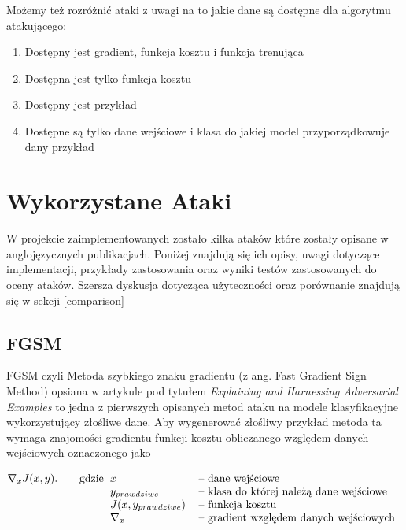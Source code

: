 \documentclass[
    left=2.5cm,         %
    right=2.5cm,        %
    top=2.5cm,          %
    bottom=3cm,         %
    bindingoffset=6mm,  %
    nohyphenation=false %
]{eiti/eiti-thesis}
\begin{document}
Możemy też rozróżnić ataki z uwagi na to jakie dane są dostępne dla algorytmu atakującego:
\begin{enumerate}
    \item Dostępny jest gradient, funkcja kosztu i funkcja trenująca
    \item Dostępna jest tylko funkcja kosztu
    \item Dostępny jest przykład
    \item Dostępne są tylko dane wejściowe i klasa do jakiej model przyporządkowuje dany przykład

\end{enumerate}

\newpage
\section{Wykorzystane Ataki}
W projekcie zaimplementowanych zostało kilka ataków które zostały opisane w anglojęzycznych publikacjach.
Poniżej znajdują się ich opisy, uwagi dotyczące implementacji, przykłady zastosowania oraz wyniki testów
zastosowanych do oceny ataków. Szersza dyskusja dotycząca użyteczności oraz porównanie znajdują się w sekcji \ref{comparison}

\subsection{FGSM}
    FGSM czyli Metoda szybkiego znaku gradientu (z ang. Fast Gradient Sign Method) opsiana w artykule
    pod tytułem \textit{Explaining and Harnessing Adversarial Examples}\cite{harnessing} to jedna z pierwszych
    opisanych metod ataku na modele klasyfikacyjne wykorzystujący złośliwe dane.
    Aby wygenerować złośliwy przykład metoda ta wymaga znajomości gradientu funkcji kosztu obliczanego względem danych
    wejściowych oznaczonego jako

    \begin{equation}
        \nabla_{x} J(x, y).
        \qquad\text{gdzie}
        \begin{tabular}[t]{ll}
        $x$   & -- dane wejściowe \\
        $y_{prawdziwe}$   & -- klasa do której należą dane wejściowe\\
        $J(x, y_{prawdziwe})$  & -- funkcja kosztu \\
        $\nabla_{x}$  & -- gradient względem danych wejściowych \\
        \end{tabular}
    \end{equation}
\end{document}
